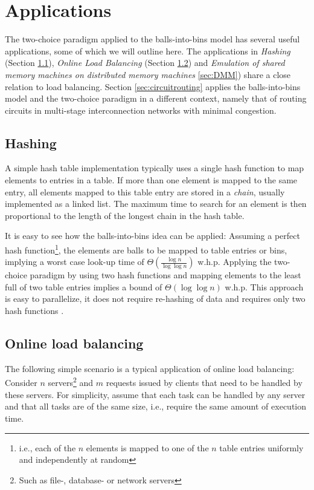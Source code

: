 \documentclass[a4paper,12pt]{article}
\begin{document}
\section{Applications}
\label{sec:applications}
The two-choice paradigm applied to the balls-into-bins model has several useful applications, some of which we will outline here. The applications in \emph{Hashing} (Section \ref{sec:hashing}), \emph{Online Load Balancing} (Section \ref{sec:loadbalancing}) and \emph{Emulation of shared memory machines on distributed memory machines} \ref{sec:DMM}) share a close relation to load balancing. Section \ref{sec:circuitrouting} applies the balls-into-bins model and the two-choice paradigm in a different context, namely that of routing circuits in multi-stage interconnection networks with minimal congestion.

\subsection{Hashing}
\label{sec:hashing}
A simple hash table implementation typically uses a single hash function to map elements to entries in a table. If more than one element is mapped to the same entry, all elements mapped to this table entry are stored in a \emph{chain}, usually implemented as a linked list. The maximum time to search for an element is then proportional to the length of the longest chain in the hash table. 

It is easy to see how the balls-into-bins idea can be applied: Assuming a perfect hash function\footnote{i.e., each of the $n$ elements is mapped to one of the $n$ table entries uniformly and independently at random}, the elements are balls to be mapped to table entries or bins, implying a worst case look-up time of $\Theta\left(\frac{\log n}{\log \log n}\right)$ w.h.p. Applying the two-choice paradigm by using two hash functions and mapping elements to the least full of two table entries implies a bound of $\Theta\left(\log \log n\right)$ w.h.p. This approach is easy to parallelize, it does not require re-hashing of data and requires only two hash functions \cite{ABKU99} \cite{MRS01}.

\subsection{Online load balancing}
\label{sec:loadbalancing}
The following simple scenario is a typical application of online load balancing: Consider $n$ servers\footnote{Such as file-, database- or network servers} and $m$ requests issued by clients that need to be handled by these servers. For simplicity, assume that each task can be handled by any server and that all tasks are of the same size, i.e., require the same amount of execution time.
\end{document}
